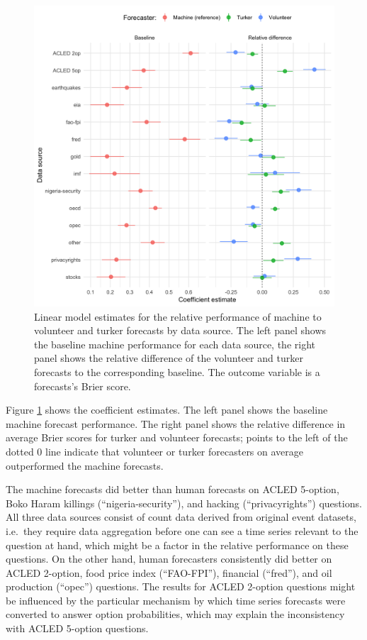 \documentclass[]{article}
\begin{document}
\begin{figure}
\caption{\label{fig:model-machine-by-data-source} Linear model estimates for the relative performance of machine to volunteer and turker forecasts by data source. The left panel shows the baseline machine performance for each data source, the right panel shows the relative difference of the volunteer and turker forecasts to the corresponding baseline. The outcome variable is a forecasts's Brier score.}
\includegraphics{../output/figures/model-machine-by-data-source.png}
\end{figure}

Figure \ref{fig:model-machine-by-data-source} shows the coefficient
estimates. The left panel shows the baseline machine forecast
performance. The right panel shows the relative difference in average
Brier scores for turker and volunteer forecasts; points to the left of
the dotted 0 line indicate that volunteer or turker forecasters on
average outperformed the machine forecasts.

The machine forecasts did better than human forecasts on ACLED 5-option,
Boko Haram killings (``nigeria-security''), and hacking
(``privacyrights'') questions. All three data sources consist of count
data derived from original event datasets, i.e.~they require data
aggregation before one can see a time series relevant to the question at
hand, which might be a factor in the relative performance on these
questions. On the other hand, human forecasters consistently did better
on ACLED 2-option, food price index (``FAO-FPI''), financial (``fred''),
and oil production (``opec'') questions. The results for ACLED 2-option
questions might be influenced by the particular mechanism by which time
series forecasts were converted to answer option probabilities, which
may explain the inconsistency with ACLED 5-option questions.
\end{document}
